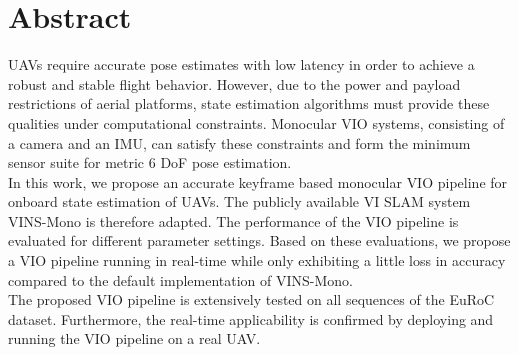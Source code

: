 \chapter*{Abstract}

\acp{UAV} require accurate pose estimates with low latency in order to achieve 
a robust and stable flight behavior. However, due to the power and payload 
restrictions 
of aerial platforms, state estimation algorithms must provide these qualities 
under computational constraints. Monocular \ac{VIO} systems, consisting 
of a camera and an \ac{IMU}, can satisfy these constraints and form the minimum 
sensor suite for 
metric 6 \ac{DoF} pose estimation.  \\

In this work, we propose an accurate keyframe based monocular \ac{VIO} pipeline 
for onboard state estimation of \acp{UAV}. The publicly available \ac{VI} 
\ac{SLAM} system VINS-Mono is therefore adapted. The performance of the 
\ac{VIO} pipeline is evaluated for different parameter settings. Based on these 
evaluations, we propose a \ac{VIO} pipeline running in real-time while only 
exhibiting a little loss in accuracy compared to the default implementation 
of VINS-Mono.\\

The proposed \ac{VIO} pipeline is extensively tested on all sequences of the 
EuRoC dataset. Furthermore, the real-time applicability is confirmed by 
deploying and running the \ac{VIO} pipeline on a real \ac{UAV}. 